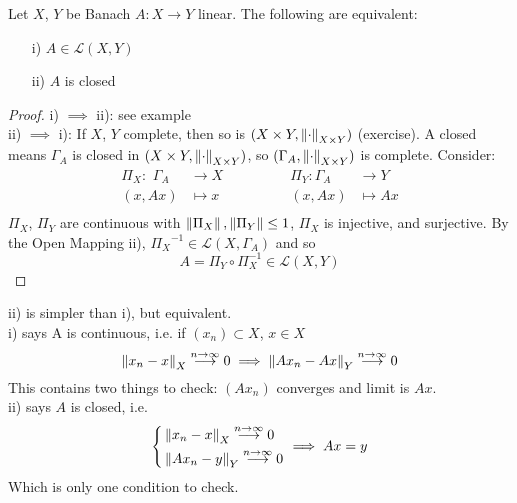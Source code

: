 \documentclass{article}
\begin{document}
\begin{theorem}\nl
\label{closed graph theorem}
Let $X$, $Y$ be Banach $A:X\to Y$ linear. The following are equivalent:
\begin{itemize}
    \item [i)] $A\in\mathcal{L}(X,Y)$
    \item [ii)] $A$ is closed
\end{itemize} 
\end{theorem}
\begin{proof}
    i) $\implies$ ii): see example\\
    ii) $\implies$ i): If $X$, $Y$ complete, then so is $(X\times Y,\left\|{\cdot}\right\|_{X\times Y})$ (exercise). A closed means $\Gamma_A$ is closed in $(X\times Y,\left\|{\cdot}\right\|_{X\times Y})$, so $(\Gamma_A,\left\|{\cdot}\right\|_{X\times Y})$ is complete. Consider:
    \begin{equation}
        \begin{aligned}
            \Pi_X:\,\,\Gamma_A&\to X \qquad\qquad& \Pi_Y:\Gamma_A&\to Y\\
        (x,Ax)&\mapsto x  & (x,Ax)&\mapsto Ax\\
        \end{aligned}    
    \end{equation}
$\Pi_X$, $\Pi_Y$ are continuous with $\left\|{\Pi_X}\right\|,\left\|{\Pi_Y}\right\|\leq 1$, $\Pi_X$ is injective, and surjective. By the Open Mapping  ii), ${\Pi_X}^{-1}\in\mathcal{L}{(X,\Gamma_A)}$ and so
$$
A=\Pi_Y\circ \Pi_X^{-1}\in\mathcal{L}(X,Y)
$$
\end{proof}

\begin{remark}
	ii) is simpler than i), but equivalent.\\
	i) says A is continuous, i.e. if $(x_n)\subset X$, $x\in X$
	$$\left\|{x_n-x}\right\|_X\overset{n\to\infty}{\longrightarrow} 0\implies\left\|{Ax_n-Ax}\right\|_Y\overset{n\to\infty}{\longrightarrow}0$$
	This contains two things to check: $(Ax_n)$ converges and limit is $Ax$.\\
	ii) says $A$ is closed, i.e.
	\begin{equation}
		\left\{
		\begin{aligned}
			&\left\|{x_n-x}\right\|_X\overset{n\to\infty}{\longrightarrow}0\\
			&\left\|{Ax_n-y}\right\|_Y\overset{n\to\infty}{\longrightarrow}0\\
		\end{aligned}
		\right.\implies
		Ax=y
	\end{equation}
	Which is only one condition to check.
\end{remark}
\end{document}
